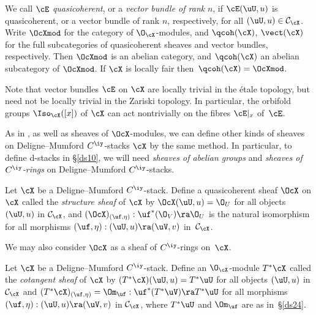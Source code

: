 \documentclass{article}
\begin{document}
\begin{dfn}
We call $\cE$ {\it quasicoherent}, or a {\it vector bundle of
rank\/} $n$, if
$\cE(\uU,u)$ is quasicoherent, or a vector bundle of rank $n$,
respectively, for all $(\uU,u)\in{\cal C}_\cX$. Write $\OcXmod$ for
the category of $\O_\cX$-modules, and $\qcoh(\cX)$, $\vect(\cX)$ for
the full subcategories of quasicoherent sheaves and vector bundles,
respectively. Then $\OcXmod$ is an abelian category, and $\qcoh(\cX)$ an abelian subcategory of $\OcXmod$. If
$\cX$ is locally fair then~$\qcoh(\cX)=\OcXmod$.
\label{ds8def9}
\end{dfn}

Note that vector bundles $\cE$ on $\cX$ are locally trivial in the
\'etale topology, but need not be locally trivial in the Zariski
topology. In particular, the orbifold groups $\Iso_\cX([x])$ of
$\cX$ can act nontrivially on the fibres $\cE\vert_x$ of~$\cE$.

As in \cite[\S 10.5]{Joyc4}, as well as sheaves of $\OcX$-modules,
we can define other kinds of sheaves on Deligne--Mumford
$C^\iy$-stacks $\cX$ by the same method. In particular, to define
d-stacks in \S\ref{ds10}, we will need {\it sheaves of abelian
groups\/} and {\it sheaves of\/ $C^\iy$-rings\/} on
Deligne--Mumford $C^\iy$-stacks.

\begin{ex} Let $\cX$ be a Deligne--Mumford $C^\iy$-stack. Define
a quasicoherent sheaf $\OcX$ on $\cX$ called the {\it structure
sheaf\/}
of $\cX$ by $\OcX(\uU,u)=\O_U$ for all objects $(\uU,u)$ in ${\cal
C}_\cX$, and $(\OcX)_{(\uf,\eta)}:\uf^*(\O_V)\ra\O_U$ is the natural
isomorphism for all morphisms $(\uf,\eta):(\uU,u)\ra(\uV,v)$
in~${\cal C}_\cX$.

We may also consider $\OcX$ as a sheaf of $C^\iy$-rings on~$\cX$.
\label{ds8ex4}
\end{ex}

\begin{ex} Let $\cX$ be a Deligne--Mumford $C^\iy$-stack. Define
an $\O_\cX$-module $T^*\cX$ called the {\it cotangent
sheaf\/} of $\cX$
by $(T^*\cX)(\uU,u)=T^*\uU$ for all objects $(\uU,u)$ in ${\cal
C}_\cX$ and $(T^*\cX)_{(\uf,\eta)}=\Om_\uf:\uf^*(T^*\uV)\ra T^*\uU$
for all morphisms $(\uf,\eta):(\uU,u)\ra(\uV,v)$ in ${\cal C}_\cX$,
where $T^*\uU$ and $\Om_\uf$ are as in~\S\ref{ds24}.
\label{ds8ex5}
\end{ex}
\end{document}
